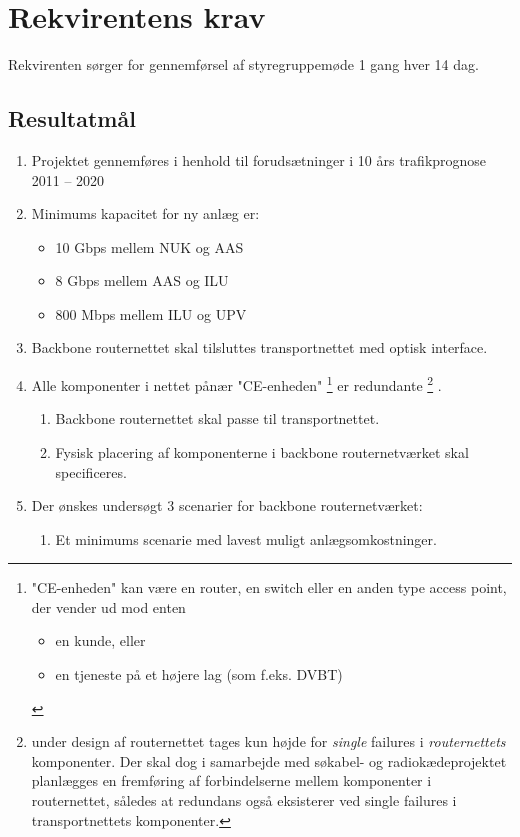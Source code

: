 \documentclass[11pt,a4paper]{article}
\begin{document}
\section{Rekvirentens krav}
 Rekvirenten sørger for gennemførsel af styregruppemøde 1 gang hver 14 dag.
\subsection{Resultatmål}
\begin{enumerate}
\item Projektet gennemføres i henhold til forudsætninger i 10 års trafikprognose 2011 – 2020
\item Minimums kapacitet for ny anlæg er:
\begin{itemize}
\item 10 Gbps mellem NUK og AAS
\item 8 Gbps mellem AAS og ILU
\item 800 Mbps mellem ILU og UPV
\end{itemize}
\item Backbone routernettet skal tilsluttes transportnettet med optisk interface.
\item Alle komponenter i nettet pånær "CE-enheden"
\footnote{
"CE-enheden" kan være en router, en switch eller en anden type access point, der vender ud mod enten
\begin{itemize}
\item en kunde, eller
\item en tjeneste på et højere lag (som f.eks. DVBT)
\end{itemize}
}
er redundante
\footnote{
under design af routernettet tages kun højde for {\em single} failures i {\em routernettets} komponenter. Der skal dog i samarbejde med søkabel- og radiokædeprojektet planlægges en fremføring af forbindelserne mellem komponenter i routernettet, således at redundans også eksisterer ved single failures i transportnettets komponenter.
}
.
\begin{enumerate}
\item Backbone routernettet skal passe til transportnettet.
\item Fysisk placering af komponenterne i backbone routernetværket skal specificeres.
\end{enumerate}
\item Der ønskes undersøgt 3 scenarier for backbone routernetværket:
\begin{enumerate}
\item Et minimums scenarie med lavest muligt anlægsomkostninger.

\end{enumerate}
\end{enumerate}
\end{document}
